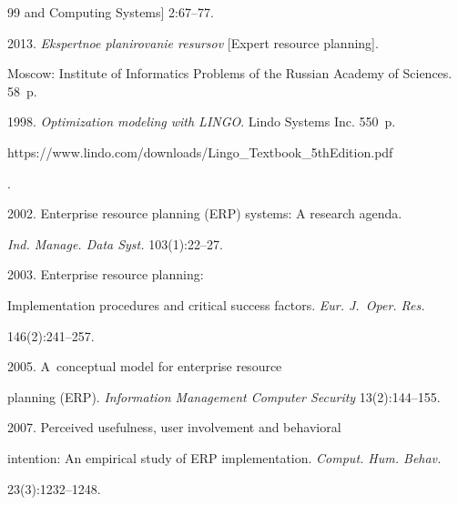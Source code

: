 {{\begin{thebibliography}{99}
and Computing Systems] 2:67--77.




 2013. \textit{Ekspertnoe planirovanie resursov} [Expert resource planning]. 


Moscow: Institute of Informatics Problems of the Russian Academy of Sciences. 58~p.







 1998. \textit{Optimization modeling with LINGO}. Lindo Systems Inc. 550~p. 


{\sf 


https://www.lindo.com/downloads/Lingo\_Textbook\_5thEdition.pdf}.




 2002. Enterprise resource planning (ERP) systems: A research agenda. 


\textit{Ind. Manage. Data Syst.} 103(1):22--27. 




 2003. Enterprise resource planning: 


Implementation procedures and critical success factors. \textit{Eur. J.~Oper. Res.}  


146(2):241--257.




 2005. A~conceptual model for enterprise resource 


planning (ERP). \textit{Information Management Computer Security} 13(2):144--155.




 2007. Perceived usefulness, user involvement and behavioral 


intention: An empirical study of ERP implementation. \textit{Comput. Hum. Behav.}  


23(3):1232--1248. 





\end{thebibliography}


} }





\vspace*{-6pt}





